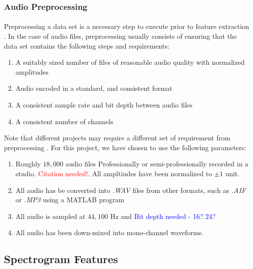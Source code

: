 \documentclass[12pt,letterpaper]{article}
\begin{document}

\subsubsection{Audio Preprocessing}
\label{subsubsec-Preprocessing}

\paragraph*{}Preprocessing a data set is a necessary step to execute prior to feature extraction \cite{Geron2,James}. In the case of audio files, preprocessing usually consists of ensuring that the data set contains the following steps and requirements:
\begin{enumerate}
\item A suitably sized number of files of reasonable audio quality with normalized amplitudes
\item Audio encoded in a standard, and consistent format
\item A consistent sample rate and bit depth between audio files
\item A consistent number of channels
\end{enumerate}
Note that different projects may require a different set of requirement from preprocessing \cite{Virtanen}. For this project, we have chosen to use the following parameters:
\begin{enumerate}
\item Roughly $18,000$ audio files Professionally or semi-professionally recorded in a studio. \textcolor{red}{Citation needed!}. All ampltiudes have been normalized to $\pm 1$ unit.
\item All audio has be converted into \textit{.WAV} files from other formats, such as \textit{.AIF} or \textit{.MP3} using a MATLAB program
\item All audio is sampled at $44,100$ Hz and \textcolor{blue}{Bit depth needed - 16? 24?}
\item All audio has been down-mixed into mono-channel waveforms.
\end{enumerate}


\newpage

\subsection{Spectrogram Features}
\label{subsec-spectrogram}
\end{document}
